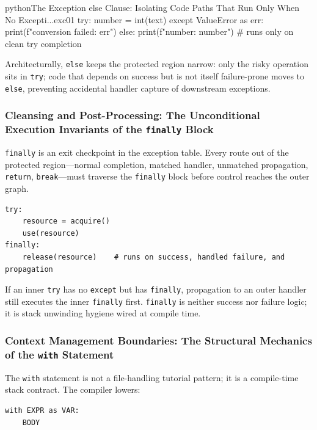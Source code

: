 \documentclass[a4paper,twoside]{report}
\begin{document}
\begin{codebox}[]{python}{The Exception else Clause: Isolating Code Paths That Run Only When No Excepti...}{exc01}
try:
    number = int(text)
except ValueError as err:
    print(f"conversion failed: {err}")
else:
    print(f"number: {number}")   # runs only on clean try completion
\end{codebox}


Architecturally, \texttt{else} keeps the protected region narrow: only the risky operation sits in \texttt{try}; code that depends on success but is not itself failure-prone moves to \texttt{else}, preventing accidental handler capture of downstream exceptions.

\subsubsection{Cleansing and Post-Processing: The Unconditional Execution Invariants of the \texttt{finally} Block}

\texttt{finally} is an exit checkpoint in the exception table. Every route out of the protected region---normal completion, matched handler, unmatched propagation, \texttt{return}, \texttt{break}---must traverse the \texttt{finally} block before control reaches the outer graph.

\begin{verbatim}
try:
    resource = acquire()
    use(resource)
finally:
    release(resource)    # runs on success, handled failure, and propagation
\end{verbatim}

If an inner \texttt{try} has no \texttt{except} but has \texttt{finally}, propagation to an outer handler still executes the inner \texttt{finally} first. \texttt{finally} is neither success nor failure logic; it is stack unwinding hygiene wired at compile time.

\subsubsection{Context Management Boundaries: The Structural Mechanics of the \texttt{with} Statement}

The \texttt{with} statement is not a file-handling tutorial pattern; it is a compile-time stack contract. The compiler lowers:

\begin{verbatim}
with EXPR as VAR:
    BODY
\end{verbatim}
\end{document}
